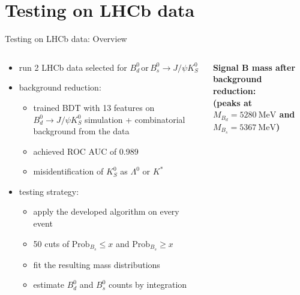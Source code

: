 \documentclass[aspectratio=1610, 10pt]{beamer}
\begin{document}
\section*{Testing on LHCb data}

\begin{frame}{Testing on LHCb data: Overview}
  \begin{columns}
    \begin{column}{0.5\textwidth}
      \begin{itemize}
        \item run 2 LHCb data selected for $B^0_d \, \text{or} \, B^0_s \rightarrow J/\psi K^0_S$
        \item background reduction:
        \begin{itemize}
          \item trained BDT with 13 features on $B^0_d \rightarrow J/\psi K^0_S$ simulation + combinatorial background from the data
          \item achieved ROC AUC of 0.989
          \item misidentification of $K^0_S$ as $\Lambda^0$ or $K^*$
        \end{itemize}
        \item testing strategy:
        \begin{itemize}
          \item apply the developed algorithm on every event
          \item 50 cuts of $\text{Prob}_{B_s} \leq x$ and $\text{Prob}_{B_s} \geq x$
          \item fit the resulting mass distributions
          \item estimate $B^0_d$ and $B^0_s$ counts by integration
        \end{itemize}
      \end{itemize}
    \end{column}
    \begin{column}{0.5\textwidth}
      \centering
      \textbf{Signal B mass after background reduction:\\(peaks at $M_{B_d} = \qty{5280}{\MeV}$ and $M_{B_s} = \qty{5367}{\MeV}$)}

\end{column}
\end{columns}
\end{frame}
\end{document}
